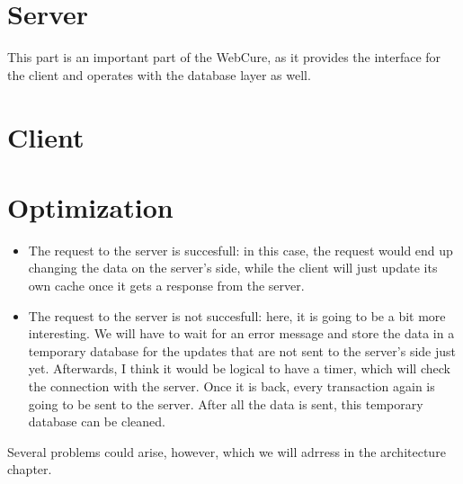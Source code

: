 \section{Server}

This part is an important part of the WebCure, as it provides the interface for the client and operates with the database layer as well. 

\section{Client}












\section{Optimization}




\begin{itemize}
    \item{The request to the server is succesfull: in this case, the request would end up changing the data on the server's side, while the client will just update its own cache once it gets a response from the server.}
    \item{The request to the server is not succesfull: here, it is going to be a bit more interesting. We will have to wait for an error message and store the data in a temporary database for the updates that are not sent to the server's side just yet. Afterwards, I think it would be logical to have a timer, which will check the connection with the server. Once it is back, every transaction again is going to be sent to the server. After all the data is sent, this temporary database can be cleaned. }
    
    \end{itemize}
    
    Several problems could arise, however, which we will adrress in the architecture chapter.
